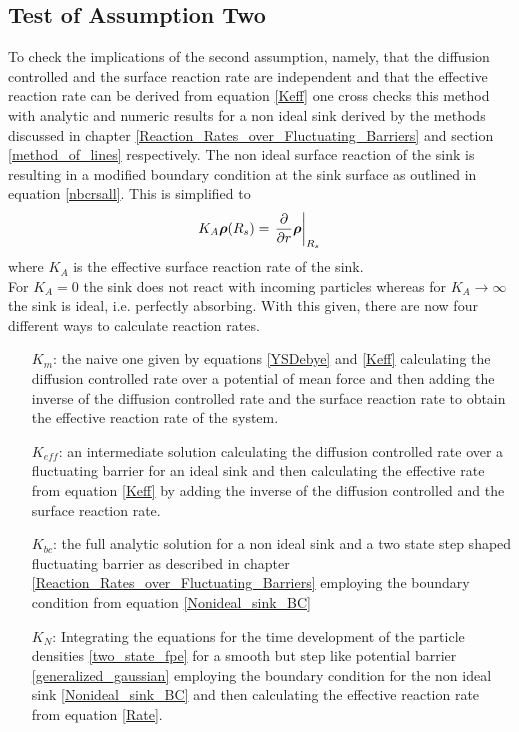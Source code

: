 \subsection{Test of Assumption Two}
\label{Assumption2}
To check the implications of the second assumption, namely, that the diffusion controlled and the surface reaction rate are independent and that the effective reaction rate can be derived from equation \eqref{Keff} one cross checks this method with analytic and numeric results for a non ideal sink derived by the methods discussed in chapter \ref{Reaction_Rates_over_Fluctuating_Barriers} and section \ref{method_of_lines} respectively. The non ideal surface reaction of the sink is resulting in a modified boundary condition at the sink surface as outlined in equation \eqref{nbcrsall}. This is simplified to
\begin{equation}
    K_A \boldsymbol{\mathbf{\rho}}(R_s) = \left. \frac{\partial}{\partial r} \boldsymbol{\mathbf{\rho}} \right|_{R_s}
    \label{Nonideal_sink_BC}
\end{equation}
where $K_A$ is the effective surface reaction rate of the sink.\\
For $K_A = 0$ the sink does not react with incoming particles whereas for $K_A \rightarrow \infty$ the sink is ideal, i.e. perfectly absorbing.
With this given, there are now four different ways to calculate reaction rates. 
\begin{itemize}
    \item[$K_m$:] the naive one given by equations \eqref{YSDebye} and \eqref{Keff} calculating the diffusion controlled rate over a potential of mean force and then adding the inverse of the diffusion controlled rate and the surface reaction rate to obtain the effective reaction rate of the system.
    \item[$K_{eff}$:] an intermediate solution calculating the diffusion controlled rate over a fluctuating barrier for an ideal sink and then calculating the effective rate from equation \eqref{Keff} by adding the inverse of the diffusion controlled and the surface reaction rate.
    \item[$K_{bc}$:] the full analytic solution for a non ideal sink and a two state step shaped fluctuating barrier as described in chapter \ref{Reaction_Rates_over_Fluctuating_Barriers} employing the boundary condition from equation \ref{Nonideal_sink_BC}
    \item[$K_N$:] Integrating the equations for the time development of the particle densities \eqref{two_state_fpe} for a smooth but step like potential barrier \eqref{generalized_gaussian} employing the boundary condition for the non ideal sink \eqref{Nonideal_sink_BC} and then calculating the effective reaction rate from equation \eqref{Rate}.
\end{itemize}
